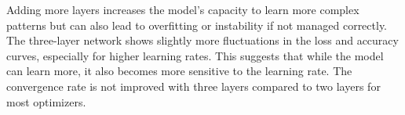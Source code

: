 \documentclass[12pt]{article}
\begin{document}
\begin{itemize}
	      Adding more layers increases the model's capacity to learn more complex patterns but can also lead to overfitting or instability if not managed correctly. The three-layer network shows slightly more fluctuations in the loss and accuracy curves, especially for higher learning rates. This suggests that while the model can learn more, it also becomes more sensitive to the learning rate. The convergence rate is not improved with three layers compared to two layers for most optimizers.
\end{itemize}
\end{document}
